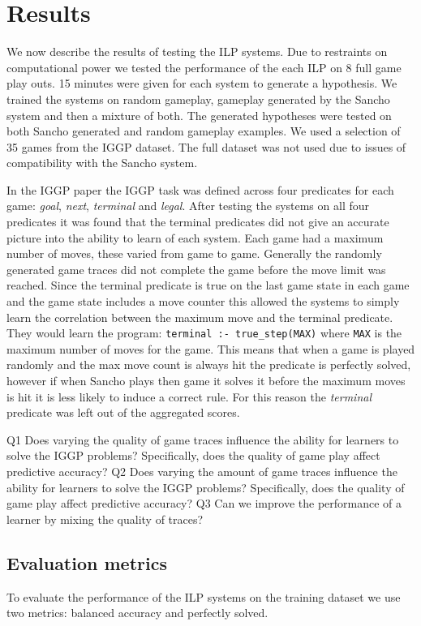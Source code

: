 \chapter{Results}\label{sec:results}
We now describe the results of testing the ILP systems. Due to restraints on computational power we tested the performance of the each ILP on 8 full game play outs. 15 minutes were given for each system to generate a hypothesis. We trained the systems on random gameplay, gameplay generated by the Sancho system and then a mixture of both. The generated hypotheses were tested on both Sancho generated and random gameplay examples. We used a selection of 35 games from the IGGP dataset\cite{Cropper/IGGP}. The full dataset was not used due to issues of compatibility with the Sancho system.

In the IGGP paper\cite{Cropper/IGGP} the IGGP task was defined across four predicates for each game: \textit{goal}, \textit{next}, \textit{terminal} and \textit{legal}. After testing the systems on all four predicates it was found that the terminal predicates did not give an accurate picture into the ability to learn of each system. Each game had a maximum number of moves, these varied from game to game. Generally the randomly generated game traces did not complete the game before the move limit was reached. Since the terminal predicate is true on the last game state in each game and the game state includes a move counter this allowed the systems to simply learn the correlation between the maximum move and the terminal predicate. They would learn the program: \verb|terminal :- true_step(MAX)| where \verb|MAX| is the maximum number of moves for the game. This means that when a game is played randomly and the max move count is always hit the predicate is perfectly solved, however if when Sancho plays then game it solves it before the maximum moves is hit it is less likely to induce a correct rule. For this reason the \textit{terminal} predicate was left out of the aggregated scores.


Q1 Does varying the quality of game traces influence the ability for learners to solve the IGGP problems? Specifically, does the quality of game play affect predictive accuracy?
Q2 Does varying the amount of game traces influence the ability for learners to solve the IGGP problems? Specifically, does the quality of game play affect predictive accuracy?
Q3 Can we improve the performance of a learner by mixing the quality of traces?

\section{Evaluation metrics}
To evaluate the performance of the ILP systems on the training dataset we use two metrics: balanced accuracy and perfectly solved.

